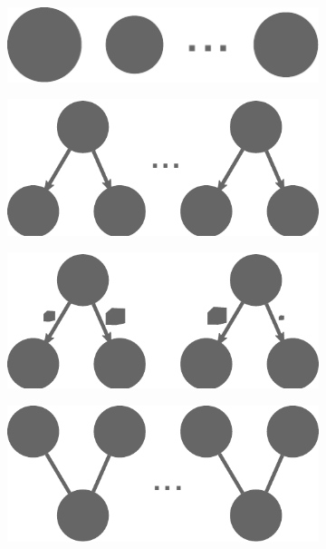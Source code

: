 \begin{figure}
	\centering
	\begin{subfigure}{.2\textwidth}
		\centering
		\includegraphics[width=.8\textwidth]{imgs/estee/shapes/plain}
		\caption{}
		\label{fig:tg-plain}
	\end{subfigure}%
	\begin{subfigure}{.2\textwidth}
		\centering
		\includegraphics[width=.8\linewidth]{imgs/estee/shapes/fork}
		\caption{}
		\label{fig:tg-fork}
	\end{subfigure}
	\begin{subfigure}{.2\textwidth}
		\centering
		\includegraphics[width=.8\linewidth]{imgs/estee/shapes/fork2}
		\caption{}
		\label{fig:tg-fork2}
	\end{subfigure}
	\begin{subfigure}{.2\textwidth}
		\centering
		\includegraphics[width=.8\linewidth]{imgs/estee/shapes/v}

\end{subfigure}
\end{figure}
